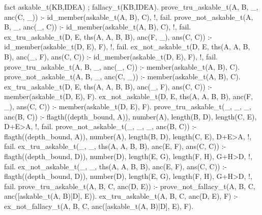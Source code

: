 fact askable_t(KB,IDEA) ; fallacy_t(KB,IDEA).
prove_tru_askable_t(A, B, _, anc(C, _)) :-
        id_member(askable_t(A, B), C), !,
        fail.
prove_not_askable_t(A, B, _, anc(_, C)) :-
        id_member(askable_t(A, B), C), !,
        fail.
ex_tru_askable_t(D, E, ths(A, A, B, B), anc(F, _), ans(C, C)) :-
        id_member(askable_t(D, E), F), !,
        fail.
ex_not_askable_t(D, E, ths(A, A, B, B), anc(_, F), ans(C, C)) :-
        id_member(askable_t(D, E), F), !,
        fail.
prove_tru_askable_t(A, B, _, anc(_, C)) :-
        member(askable_t(A, B), C).
prove_not_askable_t(A, B, _, anc(C, _)) :-
        member(askable_t(A, B), C).
ex_tru_askable_t(D, E, ths(A, A, B, B), anc(_, F), ans(C, C)) :-
        member(askable_t(D, E), F).
ex_not_askable_t(D, E, ths(A, A, B, B), anc(F, _), ans(C, C)) :-
        member(askable_t(D, E), F).
prove_tru_askable_t(_, _, _, anc(B, C)) :-
        flagth((depth_bound, A)),
        number(A),
        length(B, D),
        length(C, E),
        D+E>A, !,
        fail.
prove_not_askable_t(_, _, _, anc(B, C)) :-
        flagth((depth_bound, A)),
        number(A),
        length(B, D),
        length(C, E),
        D+E>A, !,
        fail.
ex_tru_askable_t(_, _, ths(A, A, B, B), anc(E, F), ans(C, C)) :-
        flagth((depth_bound, D)),
        number(D),
        length(E, G),
        length(F, H),
        G+H>D, !,
        fail.
ex_not_askable_t(_, _, ths(A, A, B, B), anc(E, F), ans(C, C)) :-
        flagth((depth_bound, D)),
        number(D),
        length(E, G),
        length(F, H),
        G+H>D, !,
        fail.
prove_tru_askable_t(A, B, C, anc(D, E)) :-
        prove_not_fallacy_t(A,
                            B,
                            C,
                            anc([askable_t(A, B)|D], E)).
ex_tru_askable_t(A, B, C, anc(D, E), F) :-
        ex_not_fallacy_t(A,
                         B,
                         C,
                         anc([askable_t(A, B)|D], E),
                         F).

